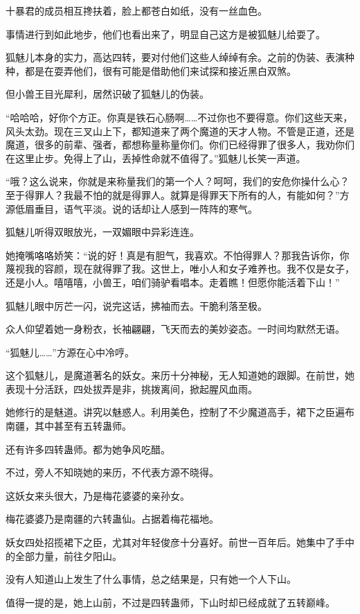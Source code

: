 \begin{this_body}
十暴君的成员相互搀扶着，脸上都苍白如纸，没有一丝血色。

事情进行到如此地步，他们也看出来了，明显自己这方是被狐魅儿给耍了。

狐魅儿本身的实力，高达四转，要对付他们这些人绰绰有余。之前的伪装、表演种种，都是在耍弄他们，很有可能是借助他们来试探和接近黑白双煞。

但小兽王目光犀利，居然识破了狐魅儿的伪装。

“哈哈哈，好你个方正。你真是铁石心肠啊……不过你也不要得意。你们这些天来，风头太劲。现在三叉山上下，都知道来了两个魔道的天才人物。不管是正道，还是魔道，很多的前辈、强者，都想称量称量你们。你们已经得罪了很多人，我劝你们在这里止步。免得上了山，丢掉性命就不值得了。”狐魅儿长笑一声道。

“哦？这么说来，你就是来称量我们的第一个人？呵呵，我们的安危你操什么心？至于得罪人？我最不怕的就是得罪人。就算是得罪天下所有的人，有能如何？”方源低眉垂目，语气平淡。说的话却让人感到一阵阵的寒气。

狐魅儿听得双眼放光，一双媚眼中异彩连连。

她掩嘴咯咯娇笑：“说的好！真是有胆气，我喜欢。不怕得罪人？那我告诉你，你蔑视我的容颜，现在就得罪了我。这世上，唯小人和女子难养也。我不仅是女子，还是小人。嘻嘻嘻，小兽王，咱们骑驴看唱本。走着瞧！但愿你能活着下山！”

狐魅儿眼中厉芒一闪，说完这话，拂袖而去。干脆利落至极。

众人仰望着她一身粉衣，长袖翩翩，飞天而去的美妙姿态。一时间均默然无语。

“狐魅儿……”方源在心中冷哼。

这个狐魅儿，是魔道著名的妖女。来历十分神秘，无人知道她的跟脚。在前世，她表现十分活跃，四处拔弄是非，挑拨离间，掀起腥风血雨。

她修行的是魅道。讲究以魅惑人。利用美色，控制了不少魔道高手，裙下之臣遍布南疆，其中甚至有五转蛊师。

还有许多四转蛊师。都为她争风吃醋。

不过，旁人不知晓她的来历，不代表方源不晓得。

这妖女来头很大，乃是梅花婆婆的亲孙女。

梅花婆婆乃是南疆的六转蛊仙。占据着梅花福地。

妖女四处招揽裙下之臣，尤其对年轻俊彦十分喜好。前世一百年后。她集中了手中的全部力量，前往夕阳山。

没有人知道山上发生了什么事情，总之结果是，只有她一个人下山。

值得一提的是，她上山前，不过是四转蛊师，下山时却已经成就了五转巅峰。


\end{this_body}
